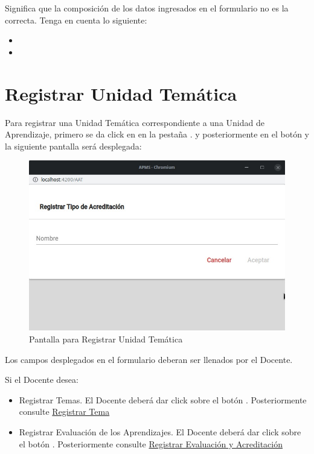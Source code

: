 \documentclass[10pt]{book}
\begin{document}
\begin{itemize}
        Significa que la composición de los datos ingresados en el formulario no es la correcta. Tenga en cuenta lo siguiente:

        \begin{itemize}
            \item 
            \item 
                            
        \end{itemize}

    \end{itemize}

\pagebreak
\hypertarget{RegUT}{\section{Registrar Unidad Temática}}

Para registrar una Unidad Temática  correspondiente a una Unidad de Aprendizaje, primero se da click en en la pestaña . y posteriormente en el botón  y la siguiente pantalla será desplegada:

\begin{figure}[!h]
    \centering
    \hypertarget{RegistrarUnidadTematica}{\includegraphics[width=0.5\linewidth]{images/SP6/9.jpeg}}
    \caption{Pantalla para Registrar Unidad Temática}
\end{figure}

Los campos desplegados en el formulario deberan ser llenados por el Docente.

Si el Docente desea:

\begin{itemize}
    \item Registrar Temas. El Docente deberá dar click sobre el botón . Posteriormente consulte \hyperlink{RegistrarTema}{Registrar Tema}
    \item Registrar Evaluación de los Aprendizajes. El Docente deberá dar click sobre el botón . Posteriormente consulte \hyperlink{REA}{Registrar Evaluación y Acreditación}
\end{itemize}
\end{document}
